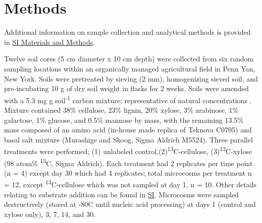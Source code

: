 \section{Methods}
Additional information on sample collection and analytical methods is provided in \href{https://www.authorea.com/users/3537/articles/8459/_show_article}{SI Materials and Methods}.


Twelve soil cores (5 cm diameter x 10 cm depth) were collected from six random sampling locations within an organically managed agricultural field in Penn Yan, New York. Soils were pretreated by sieving (2 mm), homogenizing sieved soil, and pre-incubating 10 g of dry soil weight in flasks for 2 weeks. Soils were amended with a 5.3 mg g soil\textsuperscript{-1} carbon mixture; representative of natural concentrations \cite{Schneckenberger_2008}. Mixture contained 38\% cellulose, 23\% lignin, 20\% xylose, 3\% arabinose, 1\% galactose, 1\% glucose, and 0.5\% mannose by mass, with the remaining 13.5\% mass composed of an amino acid (in-house made replica of Teknova C0705) and basal salt mixture (Murashige and Skoog, Sigma Aldrich M5524). Three parallel treatments were performed; (1) unlabeled control,(2)\textsuperscript{13}C-cellulose, (3)\textsuperscript{13}C-xylose (98 atom\% \textsuperscript{13}C, Sigma Aldrich). Each treatment had 2 replicates per time point (n = 4) except day 30 which had 4 replicates; total microcosms per treatment n = 12, except \textsuperscript{13}C-cellulose which was not sampled at day 1, n = 10. Other details relating to substrate addition can be found in \href{https://authorea.com/users/3537/articles/8459/_show_article}{SI}. Microcosms were sampled destructively (stored at -80{\textdegree}C until nucleic acid processing) at days 1 (control and xylose only), 3, 7, 14, and 30.


